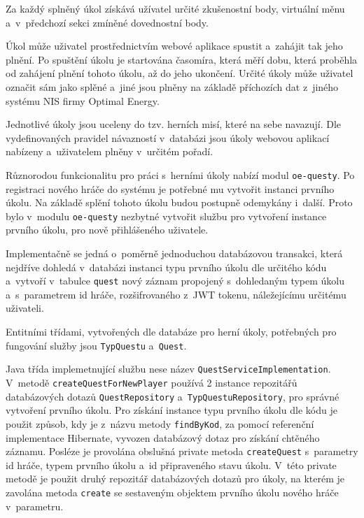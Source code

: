 \documentclass[12pt]{article}
\begin{document}
{Za každý splněný úkol získává užívatel určité zkušenostní body, 
virtuální měnu a~v~předchozí sekci zmíněné dovednostní body. 

Úkol může uživatel prostřednictvím webové aplikace spustit a~zahájit tak jeho plnění. 
Po spuštění úkolu je startována časomíra, která měří dobu, 
která proběhla od zahájení plnění tohoto úkolu, až do jeho ukončení. 
Určité úkoly může uživatel označit sám jako splěné 
a~jiné jsou plněny na základě příchozích dat z~jiného systému NIS firmy Optimal Energy. 

Jednotlivé úkoly jsou uceleny do tzv. herních misí, které na sebe navazují. 
Dle vydefinovaných pravidel návazností v~databázi jsou úkoly webovou aplikací nabízeny 
a~uživatelem plněny v~určitém pořadí.

Různorodou funkcionalitu pro práci s~herními úkoly nabízí modul \texttt{oe-questy}.
Po registraci nového hráče do systému je potřebné mu vytvořit instanci prvního úkolu. 
Na základě splění tohoto úkolu budou postupně odemykány i~další. 
Proto bylo v~modulu \texttt{oe-questy} nezbytné vytvořit službu pro vytvoření instance prvního úkolu, 
pro nově přihlášeného uživatele. 

Implementačně se jedná o~poměrně jednoduchou databázovou transakci, která nejdříve dohledá v~databázi instanci typu prvního úkolu dle určitého kódu a~vytvoří v~tabulce \texttt{quest} nový záznam propojený s~dohledaným typem úkolu a~s~parametrem id hráče, rozšifrovaného z~JWT tokenu, náležejícímu určitému uživateli.


Entitními třídami, vytvořených dle databáze pro herní úkoly, 
potřebných pro fungování služby jsou \texttt{TypQuestu} a~\texttt{Quest}.


\obrazek
{}


Java třída implemetnující službu nese název \texttt{QuestServiceImplementation}.
V~metodě \texttt{createQuestForNewPlayer} používá 2 instance repozitářů databázových dotazů \texttt{QuestRepository} a~\texttt{TypQuestuRepository}, pro správné vytvoření prvního úkolu. Pro získání instance typu prvního úkolu dle kódu je použit způsob, kdy je z~názvu metody \texttt{findByKod}, za pomocí referenční implementace Hibernate, vyvozen databázový dotaz pro získání chtěného záznamu. Posléze je provolána obslušná private metoda \texttt{createQuest} s~parametry id hráče, typem prvního úkolu a~id připraveného stavu úkolu. V~této private metodě je použit druhý repozitář databázových dotazů pro úkoly, na kterém je zavolána metoda \texttt{create} se sestaveným objektem prvního úkolu nového hráče v~parametru.

}
\end{document}
